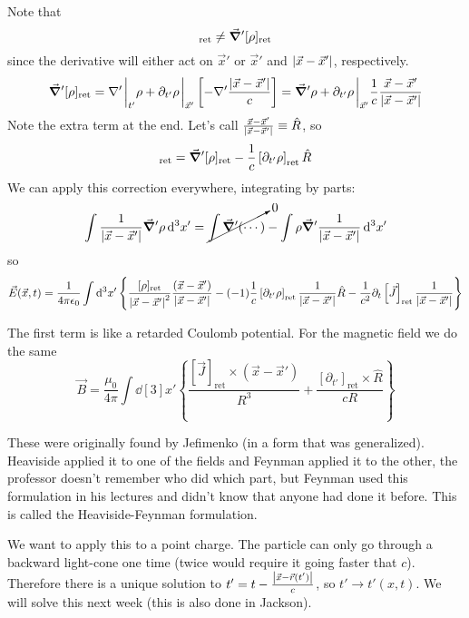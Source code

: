 \documentclass[a4paper,twoside,master.tex]{subfiles}
\begin{document}
Note that
\begin{equation}
    [\grad'{\rho}]_{\text{ret}} \neq \grad'{[\rho]_{\text{ret}}}
\end{equation}
since the derivative will either act on $ \vec{x}' $ or $ \vec{x}' $ and $ \abs{ \vec{x} - \vec{x}'} $, respectively.
\begin{equation}
    \grad'{[\rho]_{\text{ret}}} = \nabla'\eval_{t'} \rho + \partial_{t'} \rho\eval_{ \vec{x}'} \left[ - \nabla' \frac{\abs{ \vec{x} - \vec{x}'}}{c} \right]= \grad'{\rho} + \partial_{t'} \rho\eval_{ \vec{x}'} \frac{1}{c} \frac{ \vec{x} - \vec{x}'}{\abs{ \vec{x} - \vec{x}'}}
\end{equation}
Note the extra term at the end. Let's call $ \frac{ \vec{x} - \vec{x}'}{\abs{ \vec{x} - \vec{x}'}} \equiv \hat{R} $, so
\begin{equation}
    [\grad'{\rho}]_{\text{ret}} = \grad'{[\rho]_{\text{ret}}} - \frac{1}{c} \left[\partial_{t'} \rho\right]_{\text{ret}}\hat{R} 
\end{equation}
We can apply this correction everywhere, integrating by parts:
\begin{equation}
    \int \frac{1}{\abs{ \vec{x} - \vec{x}'}} \grad'{\rho} \dd[3]{x'} = \cancelto{0}{\int \grad'{(\cdots)}} - \int\rho\grad'{ \frac{1}{\abs{ \vec{x} - \vec{x}'}}} \dd[3]{x'}
\end{equation}
so
\begin{equation}
    \vec{E}( \vec{x},t) = \frac{1}{4 \pi \epsilon_0} \int \dd[3]{x'} \left\{\frac{[\rho]_{\text{ret}}}{\abs{ \vec{x} - \vec{x}'}^2} \frac{( \vec{x} - \vec{x}')}{\abs{ \vec{x} - \vec{x}'}} - (-1) \frac{1}{c} \left[ \partial_{t'}\rho \right]_{\text{ret}} \frac{1}{\abs{ \vec{x} - \vec{x}'}} \hat{R} - \frac{1}{c^2} \partial_t \left[ \vec{J} \right]_{\text{ret}} \frac{1}{\abs{ \vec{x} - \vec{x}'}}  \right\}
\end{equation}

The first term is like a retarded Coulomb potential. For the magnetic field we do the same
\begin{equation}
    \vec{B} = \frac{\mu_0}{4 \pi} \int \dd[3]{x'} \left\{ \frac{[ \vec{J}]_{\text{ret}} \times ( \vec{x} - \vec{x}')}{R^3} + \frac{[\partial_{t'}]_{\text{ret}} \times \hat{R}}{cR} \right\}
\end{equation}

These were originally found by Jefimenko (in a form that was generalized). Heaviside applied it to one of the fields and Feynman applied it to the other, the professor doesn't remember who did which part, but Feynman used this formulation in his lectures and didn't know that anyone had done it before. This is called the Heaviside-Feynman formulation.

We want to apply this to a point charge. The particle can only go through a backward light-cone one time (twice would require it going faster that $ c $). Therefore there is a unique solution to $ t' = t - \frac{\abs{ \vec{x} - \vec{r}(t')}}{c} $, so $ t' \to t'(x,t) $. We will solve this next week (this is also done in Jackson).
\end{document}
